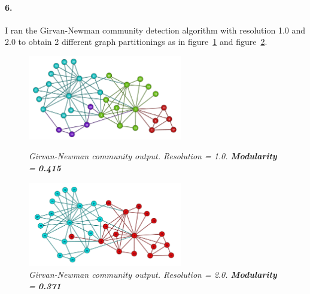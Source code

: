 \documentclass[a4paper,12pt]{article}
\begin{document}
\paragraph{6.} I ran the Girvan-Newman community detection algorithm with resolution 1.0 and 2.0 to obtain 2 different graph partitionings as in figure~\ref{fig:m1} and figure~\ref{fig:m2}.
\begin{figure}
    \centering
    \caption{\emph{Girvan-Newman community output. Resolution = 1.0. \textbf{Modularity} = \textbf{0.415}}\vspace{4em}}
    \includegraphics[width=0.6\textwidth]{subset_1.PNG}
    \label{fig:m1}
\end{figure} 
\begin{figure}
    \centering
    \includegraphics[width=0.6\textwidth]{subset_2.PNG}
    \caption{\emph{Girvan-Newman community output. Resolution = 2.0. \textbf{Modularity} = \textbf{0.371}}\vspace{4em}}
    \label{fig:m2}
\end{figure} 



\end{document}
